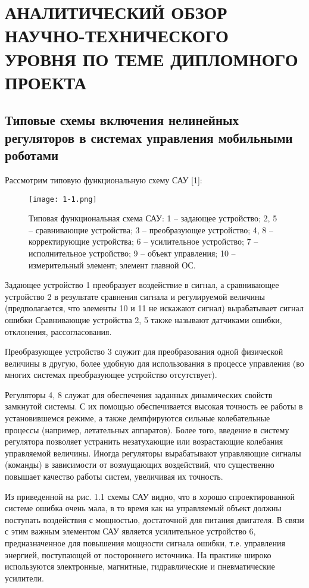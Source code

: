 \section{АНАЛИТИЧЕСКИЙ ОБЗОР НАУЧНО-ТЕХНИЧЕСКОГО УРОВНЯ ПО ТЕМЕ ДИПЛОМНОГО ПРОЕКТА}
\label{sec:domain}

\subsection{Типовые схемы включения нелинейных регуляторов в системах управления мобильными роботами}
\label{sub:domain:1}
Рассмотрим типовую функциональную схему САУ [1]:

\begin{figure}[ht]
\centering
  \texttt{[image: 1-1.png]}  
  \caption{ Типовая функциональная схема САУ:
  1 – задающее устройство; 2, 5 – сравнивающие устройства; 3 – преобразующее устройство; 4, 8 – корректирующие устройства; 6 – усилительное устройство; 7 – исполнительное устройство; 9 – объект управления; 10 – измерительный элемент; элемент главной ОС.}
  \label{fig:domain:1:1}
\end{figure}

Задающее устройство 1 преобразует воздействие в сигнал, а сравнивающее устройство 2 в результате сравнения сигнала и регулируемой величины (предполагается, что элементы 10 и 11 не искажают сигнал) вырабатывает сигнал ошибки Сравнивающие устройства 2, 5 также называют датчиками ошибки, отклонения, рассогласования.

Преобразующее устройство 3 служит для преобразования одной физической величины в другую, более удобную для использования в процессе управления (во многих системах преобразующее устройство отсутствует).

Регуляторы 4, 8 служат для обеспечения заданных динамических свойств замкнутой системы. С их помощью обеспечивается высокая точность ее работы в установившемся режиме, а также демпфируются сильные колебательные процессы (например, летательных аппаратов). Более того, введение в систему регулятора позволяет устранить незатухающие или возрастающие колебания управляемой величины. Иногда регуляторы вырабатывают управляющие сигналы (команды) в зависимости от возмущающих воздействий, что существенно повышает качество работы систем, увеличивая их точность.

Из приведенной на рис. 1.1 схемы САУ видно, что в хорошо спроектированной системе ошибка очень мала, в то время как на управляемый объект должны поступать воздействия с мощностью, достаточной для питания двигателя. В связи с этим важным элементом САУ является усилительное устройство 6, предназначенное для повышения мощности сигнала ошибки, т.е. управления энергией, поступающей от постороннего источника. На практике широко используются электронные, магнитные, гидравлические и пневматические усилители.

